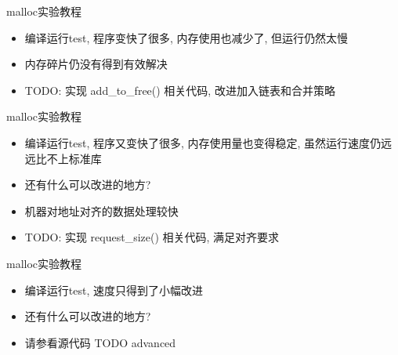 \begin{frame}[fragile]{malloc实验教程}
    \begin{itemize}[<+- | alert@+>]
        \item 编译运行test, 程序变快了很多, 内存使用也减少了, 但运行仍然太慢
        \item 内存碎片仍没有得到有效解决
        \item TODO: 实现 add\_to\_free() 相关代码, 改进加入链表和合并策略
    \end{itemize}
\end{frame}

\begin{frame}[fragile]{malloc实验教程}
    \begin{itemize}[<+- | alert@+>]
        \item 编译运行test, 程序又变快了很多, 内存使用量也变得稳定, 虽然运行速度仍远远比不上标准库
        \item 还有什么可以改进的地方?
        \item 机器对地址对齐的数据处理较快
        \item TODO: 实现 request\_size() 相关代码, 满足对齐要求
    \end{itemize}
\end{frame}

\begin{frame}[fragile]{malloc实验教程}
    \begin{itemize}[<+- | alert@+>]
        \item 编译运行test, 速度只得到了小幅改进
        \item 还有什么可以改进的地方?
        \item 请参看源代码 TODO advanced
    \end{itemize}
\end{frame}